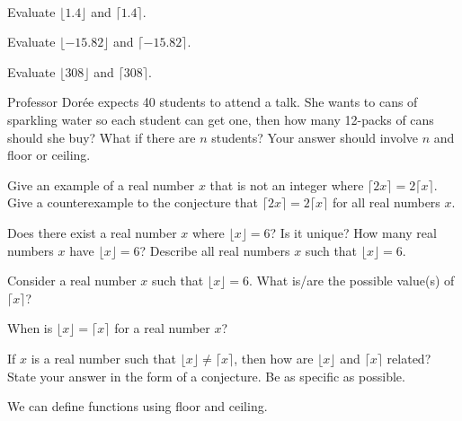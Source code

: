 \begin{act}
\label{act_floor_ceiling} 
~
    \begin{actpart}
        \item Evaluate $\lfloor 1.4 \rfloor$ and $\lceil 1.4 \rceil$.
        \item Evaluate $\lfloor -15.82 \rfloor$ and $\lceil -15.82 \rceil$.
        \item Evaluate $\lfloor 308 \rfloor$ and $\lceil 308 \rceil$.
        \item Professor Dor\'ee expects 40 students to attend a talk. She wants to cans of sparkling water so each student can get one, then how many 12-packs of cans should she buy?  What if there are $n$ students? Your answer should involve $n$ and floor or ceiling.

    \item Give an example of a real number $x$ that is not an integer where $\lceil 2x \rceil = 2 \lceil x \rceil$.   Give a counterexample to the conjecture that $\lceil 2x \rceil = 2 \lceil x \rceil$ for all real numbers $x$. 
    
    \item Does there exist a real number $x$ where $\lfloor x \rfloor = 6$?  Is it unique?  How many real numbers $x$ have $\lfloor x \rfloor = 6$? Describe all real numbers $x$ such that $\lfloor x \rfloor = 6$.

    \item Consider a real number $x$ such that $\lfloor x \rfloor = 6$.  What is/are the possible value(s) of $\lceil x \rceil$?

    \item When is $\lfloor x \rfloor = \lceil x \rceil$ for a real number $x$? 

    \item If $x$ is a real number such that $\lfloor x \rfloor \neq \lceil x \rceil$, then how are $\lfloor x \rfloor$ and $\lceil x \rceil$ related?  State your answer in the form of a conjecture.  Be as specific as possible.

    \end{actpart}
\end{act}

We can define functions using floor and ceiling. 

